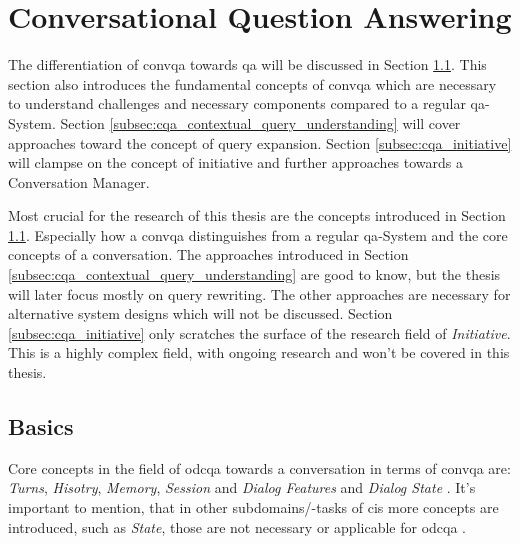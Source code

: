 
\section{Conversational Question Answering}
\label{sec:cqa}

The differentiation of \gls{convqa} towards \gls{qa} will be discussed in Section \ref{subsec:cqa_basics}. This section also introduces the fundamental concepts of \gls{convqa} which are necessary to understand challenges and necessary components compared to a regular \gls{qa}-System. Section \ref{subsec:cqa_contextual_query_understanding} will cover approaches toward the concept of query expansion. Section \ref{subsec:cqa_initiative} will clampse on the concept of initiative and further approaches towards a Conversation Manager.

 Most crucial for the research of this thesis are the concepts introduced in Section \ref{subsec:cqa_basics}. Especially how a \gls{convqa} distinguishes from a regular \gls{qa}-System and the core concepts of a conversation. The approaches introduced in Section \ref{subsec:cqa_contextual_query_understanding} are good to know, but the thesis will later focus mostly on query rewriting. The other approaches are necessary for alternative system designs which will not be discussed. Section \ref{subsec:cqa_initiative} only scratches the surface of the research field of \textit{Initiative}. This is a highly complex field, with ongoing research and won't be covered in this thesis.

\subsection{Basics}
\label{subsec:cqa_basics}

Core concepts in the field of \gls{odcqa} towards a conversation in terms of \gls{convqa} are: \textit{Turns}, \textit{Hisotry}, \textit{Memory}, \textit{Session} and \textit{Dialog Features} and \textit{Dialog State} \cite{zamani_conversational_2023}. It's important to mention, that in other subdomains/-tasks of \gls{cis} more concepts are introduced, such as \textit{State}, those are not necessary or applicable for \gls{odcqa} \cite{zaib_conversational_2021}.

